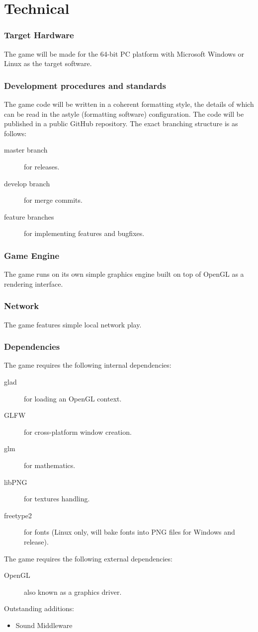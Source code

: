 \part{Technical}
\section{Target Hardware}
The game will be made for the 64-bit PC platform with Microsoft Windows
or Linux as the target software.
\section{Development procedures and standards}
The game code will be written in a coherent formatting style, the details of
which can be read in the astyle (formatting software) configuration.
The code will be published in a public GitHub repository. The exact branching
structure is as follows:
\begin{description}
    \item[master branch] for releases.
    \item[develop branch] for merge commits.
    \item[feature branches] for implementing features and bugfixes.
\end{description}
\section{Game Engine}
The game runs on its own simple graphics engine built on top of OpenGL as a
rendering interface.
\section{Network}
The game features simple local network play.
\section{Dependencies}
The game requires the following internal dependencies:

\begin{description}
    \item[glad] for loading an OpenGL context.
    \item[GLFW] for cross-platform window creation.
    \item[glm] for mathematics.
    \item[libPNG] for textures handling.
    \item[freetype2] for fonts (Linux only, will bake fonts into PNG files for Windows and release).
\end{description}

The game requires the following external dependencies:

\begin{description}
    \item[OpenGL] also known as a graphics driver.
\end{description}

Outstanding additions:

\begin{itemize}
    \item Sound Middleware
\end{itemize}
